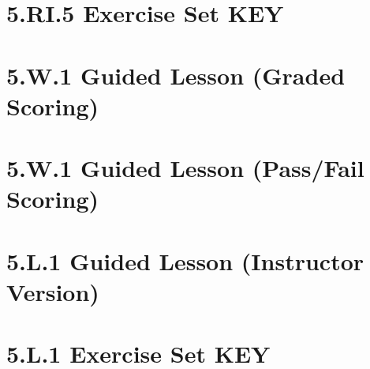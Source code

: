 \documentclass[a4paper,12pt]{article}
\begin{document}
\newpage
\section{5.RI.5 Exercise Set KEY}


\newpage
\section{5.W.1 Guided Lesson (Graded Scoring)}




\newpage
\section{5.W.1 Guided Lesson (Pass/Fail Scoring)}


\newpage
\section{5.L.1 Guided Lesson (Instructor Version)}



\newpage
\section{5.L.1 Exercise Set KEY}

\end{document}
